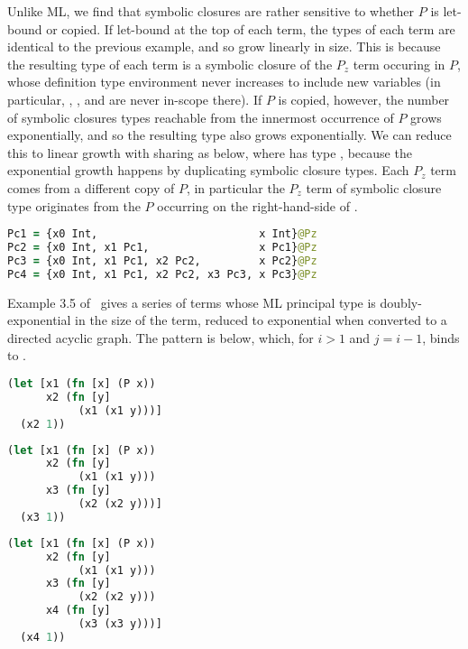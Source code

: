 Unlike ML, we find that symbolic closures are rather sensitive to whether $P$
is let-bound or copied.
If let-bound at the top of each term, the types of each term are
identical to the previous example, and so grow linearly in size.
This is because the resulting type of each term is a symbolic closure of the
$P_z$ term occuring in $P$, whose definition type environment
never increases to include new variables (in particular, , , and 
are never in-scope there).
If $P$ is copied, however, the number of symbolic closures types reachable from
the innermost occurrence of $P$ grows exponentially, and so the resulting type also
grows exponentially.
We can reduce this to linear growth with sharing as below, where  has type ,
because the exponential growth happens by duplicating symbolic closure types.
Each $P_z$ term comes from a different copy of $P$, in particular
the $P_z$ term of symbolic closure type  originates from the $P$ occurring on the right-hand-side of .

\begin{lstlisting}[language=Clojure]
Pc1 = {x0 Int,                         x Int}@Pz
Pc2 = {x0 Int, x1 Pc1,                 x Pc1}@Pz
Pc3 = {x0 Int, x1 Pc1, x2 Pc2,         x Pc2}@Pz
Pc4 = {x0 Int, x1 Pc1, x2 Pc2, x3 Pc3, x Pc3}@Pz
\end{lstlisting}

Example 3.5 of~\cite{kanellakis1989polymorphic} gives a series of terms whose ML principal
type is doubly-exponential in the size of the term,
reduced to exponential when converted to a directed acyclic graph.
The pattern is below, which, for $i>1$ and $j=i-1$, binds  to .

\begin{minipage}[t]{0.31\linewidth}
\begin{lstlisting}[language=Clojure]
(let [x1 (fn [x] (P x))
      x2 (fn [y]
           (x1 (x1 y)))]
  (x2 1))
\end{lstlisting}
\end{minipage}
%
\begin{minipage}[t]{0.31\linewidth}
\begin{lstlisting}[language=Clojure]
(let [x1 (fn [x] (P x))
      x2 (fn [y]
           (x1 (x1 y)))
      x3 (fn [y]
           (x2 (x2 y)))]
  (x3 1))
\end{lstlisting}
\end{minipage}
%
\begin{minipage}[t]{0.31\linewidth}
\begin{lstlisting}[language=Clojure]
(let [x1 (fn [x] (P x))
      x2 (fn [y]
           (x1 (x1 y)))
      x3 (fn [y]
           (x2 (x2 y)))
      x4 (fn [y]
           (x3 (x3 y)))]
  (x4 1))
\end{lstlisting}
\end{minipage}

